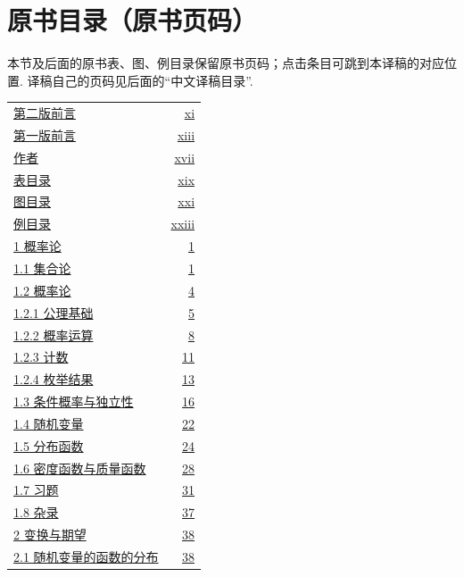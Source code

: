 \section*{原书目录（原书页码）}\label{front:source-contents}
本节及后面的原书表、图、例目录保留原书页码；点击条目可跳到本译稿的对应位置. 译稿自己的页码见后面的“中文译稿目录”.

\begingroup\small
\begin{longtable}{@{}p{}r@{}}
\hyperref[front:preface-second]{第二版前言} & \hyperref[front:preface-second]{xi} \\
\hyperref[front:preface-first]{第一版前言} & \hyperref[front:preface-first]{xiii} \\
\hyperref[front:authors]{作者} & \hyperref[front:authors]{xvii} \\
\hyperref[front:tables]{表目录} & \hyperref[front:tables]{xix} \\
\hyperref[front:figures]{图目录} & \hyperref[front:figures]{xxi} \\
\hyperref[front:examples]{例目录} & \hyperref[front:examples]{xxiii} \\
\hyperref[sec:1]{1 概率论} & \hyperref[sec:1]{1} \\
\hyperref[sec:1.1]{1.1 集合论} & \hyperref[sec:1.1]{1} \\
\hyperref[sec:1.2]{1.2 概率论} & \hyperref[sec:1.2]{4} \\
\hyperref[sec:1.2.1]{1.2.1 公理基础} & \hyperref[sec:1.2.1]{5} \\
\hyperref[sec:1.2.2]{1.2.2 概率运算} & \hyperref[sec:1.2.2]{8} \\
\hyperref[sec:1.2.3]{1.2.3 计数} & \hyperref[sec:1.2.3]{11} \\
\hyperref[sec:1.2.4]{1.2.4 枚举结果} & \hyperref[sec:1.2.4]{13} \\
\hyperref[sec:1.3]{1.3 条件概率与独立性} & \hyperref[sec:1.3]{16} \\
\hyperref[sec:1.4]{1.4 随机变量} & \hyperref[sec:1.4]{22} \\
\hyperref[sec:1.5]{1.5 分布函数} & \hyperref[sec:1.5]{24} \\
\hyperref[sec:1.6]{1.6 密度函数与质量函数} & \hyperref[sec:1.6]{28} \\
\hyperref[sec:1.7]{1.7 习题} & \hyperref[sec:1.7]{31} \\
\hyperref[sec:1.8]{1.8 杂录} & \hyperref[sec:1.8]{37} \\
\hyperref[sec:2]{2 变换与期望} & \hyperref[sec:2]{38} \\
\hyperref[sec:2.1]{2.1 随机变量的函数的分布} & \hyperref[sec:2.1]{38} \\

\end{longtable}
